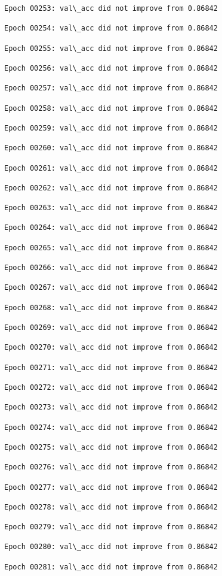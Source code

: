 \documentclass[11pt]{article}
\begin{document}
\begin{Verbatim}[commandchars=\\\{\}]
Epoch 00253: val\_acc did not improve from 0.86842

Epoch 00254: val\_acc did not improve from 0.86842

Epoch 00255: val\_acc did not improve from 0.86842

Epoch 00256: val\_acc did not improve from 0.86842

Epoch 00257: val\_acc did not improve from 0.86842

Epoch 00258: val\_acc did not improve from 0.86842

Epoch 00259: val\_acc did not improve from 0.86842

Epoch 00260: val\_acc did not improve from 0.86842

Epoch 00261: val\_acc did not improve from 0.86842

Epoch 00262: val\_acc did not improve from 0.86842

Epoch 00263: val\_acc did not improve from 0.86842

Epoch 00264: val\_acc did not improve from 0.86842

Epoch 00265: val\_acc did not improve from 0.86842

Epoch 00266: val\_acc did not improve from 0.86842

Epoch 00267: val\_acc did not improve from 0.86842

Epoch 00268: val\_acc did not improve from 0.86842

Epoch 00269: val\_acc did not improve from 0.86842

Epoch 00270: val\_acc did not improve from 0.86842

Epoch 00271: val\_acc did not improve from 0.86842

Epoch 00272: val\_acc did not improve from 0.86842

Epoch 00273: val\_acc did not improve from 0.86842

Epoch 00274: val\_acc did not improve from 0.86842

Epoch 00275: val\_acc did not improve from 0.86842

Epoch 00276: val\_acc did not improve from 0.86842

Epoch 00277: val\_acc did not improve from 0.86842

Epoch 00278: val\_acc did not improve from 0.86842

Epoch 00279: val\_acc did not improve from 0.86842

Epoch 00280: val\_acc did not improve from 0.86842

Epoch 00281: val\_acc did not improve from 0.86842


\end{Verbatim}
\end{document}
